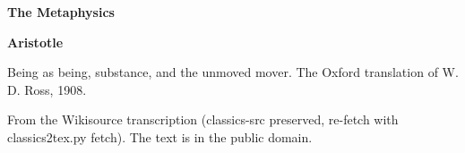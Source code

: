 \documentclass[11pt,letterpaper]{article}
\begin{document}
\color{ink}

\begin{titlepage}
\centering
\vspace*{4em}
{\LARGE\bfseries\color{heading} The Metaphysics\par}
\vspace{2em}
{\Large\bfseries\color{heading} Aristotle\par}
\vspace{2.5em}
{\itshape\color{subhead}\parbox{0.8\linewidth}{\centering Being as being, substance, and the unmoved mover. The Oxford translation of W. D. Ross, 1908.\par}}
\vfill
{\small From the Wikisource transcription (classics-src preserved, re-fetch with classics2tex.py fetch). The text is in the public domain.\par}
\vspace{2em}
\end{titlepage}

\tableofcontents


\end{document}
